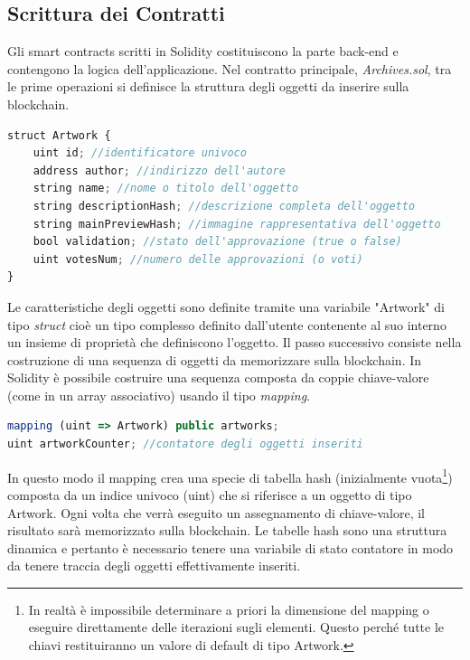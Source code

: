 \subsection{Scrittura dei Contratti}

Gli smart contracts scritti in Solidity costituiscono la parte back-end e contengono la logica dell'applicazione. Nel contratto principale, \emph{Archives.sol}, tra le prime operazioni si definisce la struttura degli oggetti da inserire sulla blockchain.
\\
\begin{lstlisting}[caption={Struttura degli oggetti},language=JavaScript]
struct Artwork {
    uint id; //identificatore univoco
    address author; //indirizzo dell'autore
    string name; //nome o titolo dell'oggetto
    string descriptionHash; //descrizione completa dell'oggetto
    string mainPreviewHash; //immagine rappresentativa dell'oggetto
    bool validation; //stato dell'approvazione (true o false)
    uint votesNum; //numero delle approvazioni (o voti)
}
\end{lstlisting}

Le caratteristiche degli oggetti sono definite tramite una variabile "Artwork" di tipo \emph{struct} cioè un tipo complesso definito dall'utente contenente al suo interno un insieme di proprietà che definiscono l'oggetto. Il passo successivo consiste nella costruzione di una sequenza di oggetti da memorizzare sulla blockchain. In Solidity è possibile costruire una sequenza composta da coppie chiave-valore (come in un array associativo) usando il tipo \emph{mapping}.
\\
\begin{lstlisting}[caption={Associazione chiave-valore},language=JavaScript]
mapping (uint => Artwork) public artworks;
uint artworkCounter; //contatore degli oggetti inseriti 
\end{lstlisting}

In questo modo il mapping crea una specie di tabella hash (inizialmente vuota\footnote{In realtà è impossibile determinare a priori la dimensione del mapping o eseguire direttamente delle iterazioni sugli elementi. Questo perché tutte le chiavi restituiranno un valore di default di tipo Artwork.}) composta da un indice univoco (uint) che si riferisce a un oggetto di tipo Artwork. Ogni volta che verrà eseguito un assegnamento di chiave-valore, il risultato sarà memorizzato sulla blockchain. Le tabelle hash sono una struttura dinamica e pertanto è necessario tenere una variabile di stato contatore in modo da tenere traccia degli oggetti effettivamente inseriti.

